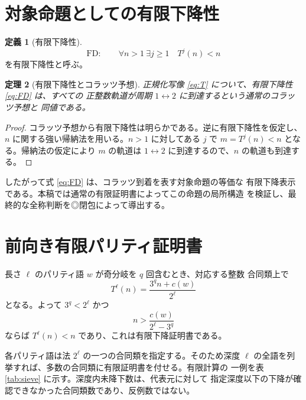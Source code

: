 \documentclass[a4paper,11pt]{ltjsarticle}
\theoremstyle{definition}
\newtheorem{definition}{定義}[section]
\theoremstyle{plain}
\newtheorem{theorem}[definition]{定理}
\newcommand{\FD}{\mathrm{FD}}
\newcommand{\1}{\mathbf{1}}
\begin{document}
\section{対象命題としての有限下降性}

\begin{definition}[有限下降性]
\begin{equation}\label{eq:FD}
 \FD:\qquad \forall n>1\ \exists j\ge1\quad T^j(n)<n
\end{equation}
を有限下降性と呼ぶ。
\end{definition}

\begin{theorem}[有限下降性とコラッツ予想]
正規化写像 \eqref{eq:T} について、有限下降性 \eqref{eq:FD} は、すべての
正整数軌道が周期 $1\leftrightarrow2$ に到達するという通常のコラッツ予想と
同値である。
\end{theorem}

\begin{proof}
コラッツ予想から有限下降性は明らかである。逆に有限下降性を仮定し、
$n$ に関する強い帰納法を用いる。$n>1$ に対してある $j$ で
$m=T^j(n)<n$ となる。帰納法の仮定により $m$ の軌道は
$1\leftrightarrow2$ に到達するので、$n$ の軌道も到達する。
\end{proof}

したがって式 \eqref{eq:FD} は、コラッツ到着を表す対象命題の等価な
有限下降表示である。本稿では通常の有限証明書によってこの命題の局所構造
を検証し、最終的な全称判断を◎閉包によって導出する。

\section{前向き有限パリティ証明書}

長さ $\ell$ のパリティ語 $w$ が奇分岐を $q$ 回含むとき、対応する整数
合同類上で
\begin{equation}\label{eq:affine}
 T^\ell(n)=\frac{3^q n+c(w)}{2^\ell}
\end{equation}
となる。よって $3^q<2^\ell$ かつ
\begin{equation}\label{eq:threshold}
 n>\frac{c(w)}{2^\ell-3^q}
\end{equation}
ならば $T^\ell(n)<n$ であり、これは有限下降証明書である。

各パリティ語は法 $2^\ell$ の一つの合同類を指定する。そのため深度
$\ell$ の全語を列挙すれば、多数の合同類に有限証明書を付せる。有限計算の
一例を表 \ref{tab:sieve} に示す。深度内未降下数は、代表元に対して
指定深度以下の下降が確認できなかった合同類数であり、反例数ではない。
\end{document}
